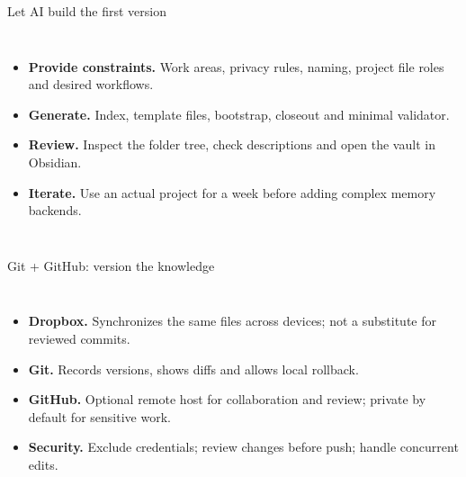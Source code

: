 \begin{frame}{Let AI build the first version}
\begin{columns}[c,onlytextwidth]
\begin{itemize}\setlength{\itemsep}{.48em}\small
\item \textbf{Provide constraints.} Work areas, privacy rules, naming, project file roles and desired workflows.
\item \textbf{Generate.} Index, template files, bootstrap, closeout and minimal validator.
\item \textbf{Review.} Inspect the folder tree, check descriptions and open the vault in Obsidian.
\item \textbf{Iterate.} Use an actual project for a week before adding complex memory backends.
\end{itemize}
\end{columns}
\medskip
{}
\end{frame}

\begin{frame}{Git + GitHub: version the knowledge}
\begin{columns}[c,onlytextwidth]
\begin{itemize}\setlength{\itemsep}{.5em}\small
\item \textbf{Dropbox.} Synchronizes the same files across devices; not a substitute for reviewed commits.
\item \textbf{Git.} Records versions, shows diffs and allows local rollback.
\item \textbf{GitHub.} Optional remote host for collaboration and review; private by default for sensitive work.
\item \textbf{Security.} Exclude credentials; review changes before push; handle concurrent edits.
\end{itemize}
\end{columns}
\end{frame}
